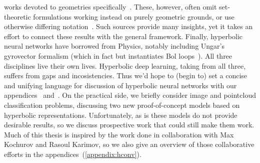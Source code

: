 works devoted to geometries specifically~\cite{thurstonThree}.
These, however, often omit set-theoretic formulations working instead on purely
geometric grounds, or use otherwise differing
notation~\cite{beardonGeometryDiscrete}. Such sources provide many insights,
yet it takes an effort to connect these results with the general framework.
Finally, hyperbolic neural networks have borrowed from Physics, notably
including Ungar's gyrovector formalism (which in fact but instantiates Bol
loops~\cite{sabinin1995gyrogroups}).  All three disciplines live their own
lives. Hyperbolic deep learning, taking from all three, suffers from gaps and
incosistencies. Thus we'd hope to (begin to) set a concise and unifying
language for discussion of hyperbolic neural networks with our
appendices~ and~.  On
the practical side, we briefly consider image and pointcloud classification
problems, discussing two new proof-of-concept models based on hyperbolic
representations.  Unfortunately, as is these models do not provide desirable
results, so we discuss prospective work that could still make them work.  Much
of this thesis is inspired by the work done in collaboration with Max Kochurov
and Rasoul Karimov, so we also give an overview of those collaborative efforts
in the appendices~(\autoref{appendix:hconv}).
